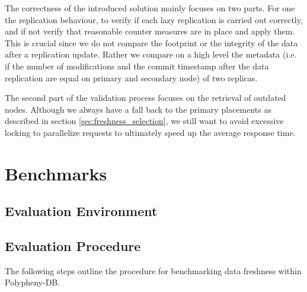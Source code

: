 The correctness of the introduced solution mainly focuses on two parts. For one the replication behaviour, to verify if each lazy replication is carried out correctly,
and if not verify that reasonable counter measures are in place and apply them. This is crucial since we do not compare the footprint or the integrity of the data after 
a replication update. Rather we compare on a high level the metadata 
(i.e. if the number of modifications and the commit timestamp after the data replication are equal on primary and secondary node) of two replicas. 

The second part of the validation process focuses on the retrieval of outdated nodes. Although we always have a fall back to the primary placements as described in section \ref{sec:freshness_selection},
we still want to avoid excessive locking to parallelize requests to ultimately speed up the average response time.


\todoMissing{\ref{sec:constraints, lazy -> eager and outdated -> refreshable}}



\section{Benchmarks}



\subsection{Evaluation Environment}


\subsection{Evaluation Procedure}
The following steps outline the procedure for benchmarking data freshness within Polypheny-DB.


